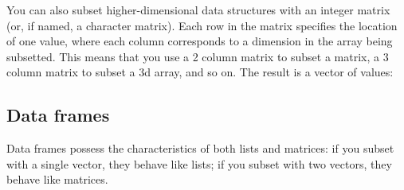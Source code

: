 You can also subset higher-dimensional data structures with an integer
matrix (or, if named, a character matrix). Each row in the matrix
specifies the location of one value, where each column corresponds to a
dimension in the array being subsetted. This means that you use a 2
column matrix to subset a matrix, a 3 column matrix to subset a 3d
array, and so on. The result is a vector of values:

\begin{Shaded}
\begin{Highlighting}[]
\StringTok{ }\NormalTok{(}\NormalTok{:}\NormalTok{, }\NormalTok{:}\NormalTok{, } \NormalTok{, } \NormalTok{)}
\StringTok{ }\NormalTok{(} \NormalTok{, } \NormalTok{, }\NormalTok{(}
  \NormalTok{, }\NormalTok{,}
  \NormalTok{, }\NormalTok{,}
  \NormalTok{, }
\NormalTok{))}
\end{Highlighting}
\end{Shaded}

\subsection{Data frames}\label{df-subsetting}

Data frames possess the characteristics of both lists and matrices: if
you subset with a single vector, they behave like lists; if you subset
with two vectors, they behave like matrices.
 

